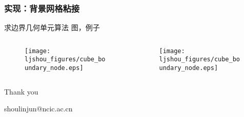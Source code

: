 \documentclass[mathserif]{beamer}
\begin{document}
\begin{CJK}{UTF8}{gkai}
\begin{frame}
	\frametitle{实现：背景网格粘接}
	求边界几何单元算法
	图，例子
	\begin{columns}
		\begin{column}[pos]{0.5\textwidth}
		\begin{figure}
			\texttt{[image: ljshou\_figures/cube\_boundary\_node.eps]}
		\end{figure}
		\end{column}
		
		\begin{column}[pos]{0.5\textwidth}
		\begin{figure}
			\texttt{[image: ljshou\_figures/cube\_boundary\_node.eps]}
		\end{figure}
		\end{column}
	\end{columns}
\end{frame}

\begin{frame}	
	\begin{block}
		\Huge{\centerline{Thank you}}
		\centerline{shoulinjun@ncic.ac.cn}
	\end{block}
\end{frame}
		
\end{CJK}
\end{document}
